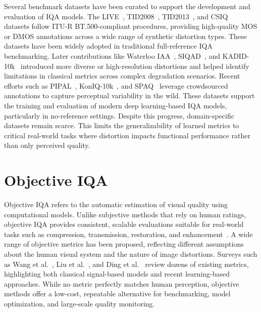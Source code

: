 Several benchmark datasets have been curated to support the development and evaluation of IQA models. The LIVE~\cite{sheikh2006statistical}, TID2008~\cite{ponomarenko2009tid2008}, TID2013~\cite{ponomarenko2015image}, and CSIQ~\cite{larson2010most} datasets follow ITU-R BT.500-compliant procedures, providing high-quality MOS or DMOS annotations across a wide range of synthetic distortion types. These datasets have been widely adopted in traditional full-reference IQA benchmarking. Later contributions like Waterloo IAA~\cite{ma2017waterloo}, SIQAD~\cite{yang2014siqad}, and KADID-10k~\cite{lin2019kadid} introduced more diverse or high-resolution distortions and helped identify limitations in classical metrics across complex degradation scenarios. Recent efforts such as PIPAL~\cite{ying2020from}, KonIQ-10k~\cite{hosu2020koniq}, and SPAQ~\cite{fang2020perceptual} leverage crowdsourced annotations to capture perceptual variability in the wild. These datasets support the training and evaluation of modern deep learning-based IQA models, particularly in no-reference settings. Despite this progress, domain-specific datasets remain scarce. This limits the generalizability of learned metrics to critical real-world tasks where distortion impacts functional performance rather than only perceived quality.

\section{Objective IQA}\label{sec:objective_iqa}

Objective IQA refers to the automatic estimation of visual quality using computational models. Unlike subjective methods that rely on human ratings, objective IQA provides consistent, scalable evaluations suitable for real-world tasks such as compression, transmission, restoration, and enhancement~\cite{gonzalez2002digital, sheikh2006image}. A wide range of objective metrics has been proposed, reflecting different assumptions about the human visual system and the nature of image distortions. Surveys such as Wang et al.~\cite{wang2004image}, Liu et al.~\cite{liu2013mmf}, and Ding et al.~\cite{ding2020dists} review dozens of existing metrics, highlighting both classical signal-based models and recent learning-based approaches. While no metric perfectly matches human perception, objective methods offer a low-cost, repeatable alternative for benchmarking, model optimization, and large-scale quality monitoring.

